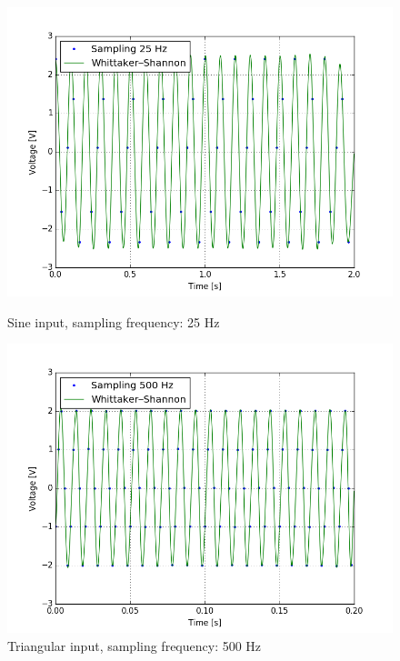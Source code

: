 \begin{figure}[H]
\centering
\begin{minipage}{.5\textwidth}
  \centering
\includegraphics[width=\textwidth]{13/25Hz.png}
\caption{Sine input, sampling frequency: 25 Hz}
\end{minipage}%
\begin{minipage}{.5\textwidth}
  \centering
\includegraphics[width=\textwidth]{13/500Hz.png}
\caption{Triangular input, sampling frequency: 500 Hz}
\end{minipage}
\end{figure}